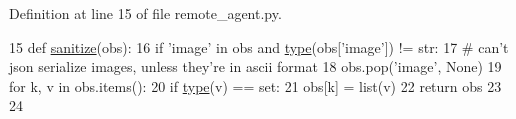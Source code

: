Definition at line 15 of file remote\+\_\+agent.\+py.


\begin{DoxyCode}
15 \textcolor{keyword}{def }\hyperlink{namespaceparlai_1_1agents_1_1remote__agent_1_1remote__agent_a89751a1e0abc561f94b94db63d8ee2c4}{sanitize}(obs):
16     \textcolor{keywordflow}{if} \textcolor{stringliteral}{'image'} \textcolor{keywordflow}{in} obs \textcolor{keywordflow}{and} \hyperlink{namespaceparlai_1_1agents_1_1tfidf__retriever_1_1build__tfidf_ad5dfae268e23f506da084a9efb72f619}{type}(obs[\textcolor{stringliteral}{'image'}]) != str:
17         \textcolor{comment}{# can't json serialize images, unless they're in ascii format}
18         obs.pop(\textcolor{stringliteral}{'image'}, \textcolor{keywordtype}{None})
19     \textcolor{keywordflow}{for} k, v \textcolor{keywordflow}{in} obs.items():
20         \textcolor{keywordflow}{if} \hyperlink{namespaceparlai_1_1agents_1_1tfidf__retriever_1_1build__tfidf_ad5dfae268e23f506da084a9efb72f619}{type}(v) == set:
21             obs[k] = list(v)
22     \textcolor{keywordflow}{return} obs
23 
24 
\end{DoxyCode}
